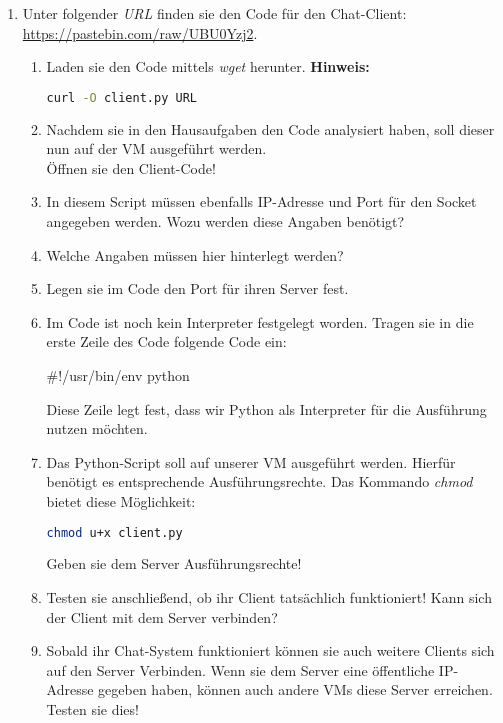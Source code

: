 \documentclass[paper=a4,fontsize=11pt]{scrartcl}%
\numberwithin{equation}{section}
\begin{document}
\begin{enumerate}
\begin{enumerate}
	\end{enumerate}
	\item Unter folgender \emph{URL} finden sie den Code für den Chat-Client: \url{https://pastebin.com/raw/UBU0Yzj2}.
	\begin{enumerate}
		\item Laden sie den Code mittels \emph{wget} herunter.
		\textbf{Hinweis:}
		\begin{lstlisting}[style=Bash, language=Bash]
curl -O client.py URL
		\end{lstlisting}
		\item Nachdem sie in den Hausaufgaben den Code analysiert haben, soll dieser nun auf der VM ausgeführt werden.\\
		Öffnen sie den Client-Code!
		\item In diesem Script müssen ebenfalls IP-Adresse und Port für den Socket angegeben werden. Wozu werden diese Angaben benötigt?
		\item Welche Angaben müssen hier hinterlegt werden?
		\item Legen sie im Code den Port für ihren Server fest.
		\item Im Code ist noch kein Interpreter festgelegt worden. Tragen sie in die erste Zeile des Code folgende Code ein:
		\begin{python}
#!/usr/bin/env python
		\end{python}
		Diese Zeile legt fest, dass wir Python als Interpreter für die Ausführung nutzen möchten.
		\item Das Python-Script soll auf unserer VM ausgeführt werden. Hierfür benötigt es entsprechende Ausführungsrechte. Das Kommando \emph{chmod} bietet diese Möglichkeit:\\
		\begin{lstlisting}[style=Bash, language=Bash]
chmod u+x client.py
		\end{lstlisting}
		Geben sie dem Server Ausführungsrechte!
		\item Testen sie anschließend, ob ihr Client tatsächlich funktioniert! Kann sich der Client mit dem Server verbinden?
		\item Sobald ihr Chat-System funktioniert können sie auch weitere Clients sich auf den Server Verbinden. Wenn sie dem Server eine öffentliche IP-Adresse gegeben haben, können auch andere VMs diese Server erreichen. Testen sie dies!
	\end{enumerate}
\end{enumerate}
\end{document}
